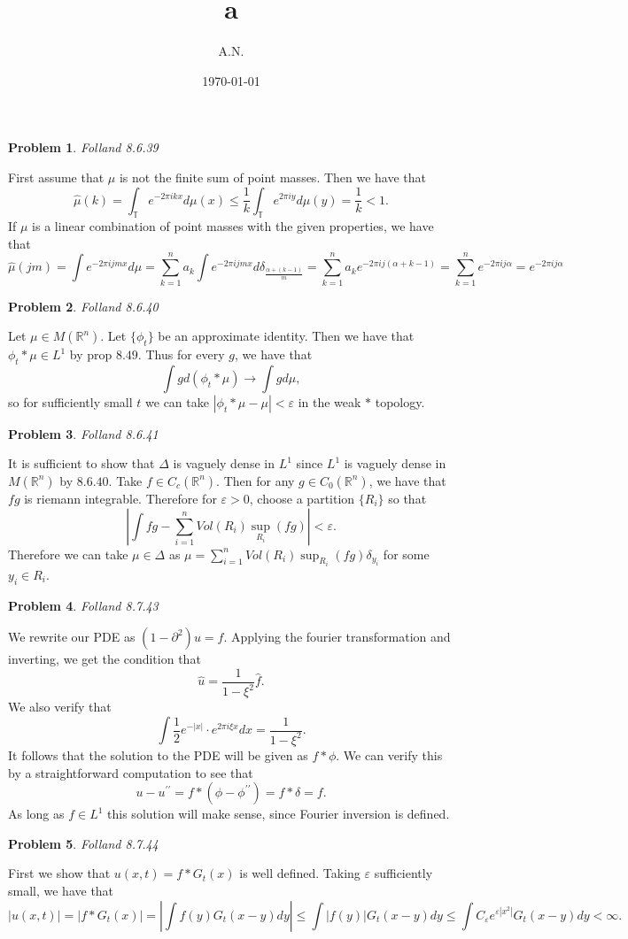 \documentclass[12pt, a4paper]{article}
\title{a}
\author{A.N.}
\date{\today}
\newtheorem{problem}{Problem}
\theoremstyle{definition}
\newcommand{\R}{\mathbb{R}}                           %
\newcommand{\ep}{\varepsilon}
\begin{document}
\begin{problem}
	Folland 8.6.39
\end{problem}
First assume that $\mu$ is not the finite sum of point masses. Then we have that 
$$\hat{\mu}(k) = \int_{\mathbb{T}} e^{-2\pi i kx} d\mu(x) \leq \frac{1}{k} \int_{\mathbb{T}}e^{2\pi i y}d\mu(y) = \frac{1}{k}<1. $$
If $\mu$ is a linear combination of point masses with the given properties, we have that 
$$\hat{\mu}(jm) =  \int e^{-2\pi i jm x } d\mu = \sum_{k=1}^n a_k \int e^{-2\pi i jmx} d \delta_{\frac{\alpha+(k-1)}{m}} = \sum_{k=1}^n a_k e^{-2\pi i j(\alpha + k-1)} =\sum_{k=1}^n e^{-2\pi i j \alpha} = e^{-2\pi i j \alpha} $$
\newpage 
\begin{problem}
	Folland 8.6.40
\end{problem}
Let $\mu\in M(\R^n)$. Let $\{\phi_t\}$ be an approximate identity. Then we have that $\phi_t \ast \mu\in L^1$ by prop $8.49$. Thus for every $g$, we have that $$\int g d(\phi_t \ast \mu) \to \int g d\mu,$$ so for sufficiently small $t$ we can take $|\phi_t \ast \mu - \mu|<\ep$ in the weak $*$ topology. 
\newpage 
\begin{problem}
	Folland 8.6.41
\end{problem}
It is sufficient to show that $\Delta$ is vaguely dense in $L^1$ since $L^1$ is vaguely dense in $M(\R^n)$ by $8.6.40$. Take $f\in C_c(\R^n)$. Then for any $g\in C_0(\R^n)$, we have that $fg$ is riemann integrable. Therefore for $\ep>0$, choose a partition $\{R_i\}$ so that 
$$\left| \int fg - \sum_{i=1}^n Vol(R_i)\sup_{R_i}(fg) \right|<\ep . $$ Therefore we can take $\mu\in \Delta$ as $\mu = \sum_{i=1}^n Vol(R_i)\sup_{R_i}(fg) \delta_{y_i}$ for some $y_i \in R_i$.
\newpage
\begin{problem}
	Folland 8.7.43
\end{problem}
We rewrite our PDE as $(1-\partial^2)u = f$. Applying the fourier transformation and inverting, we get the condition that $$\hat{u} = \frac{1}{1 - \xi^2}\hat{f}.$$ We also verify that $$\int \frac{1}{2}e^{-|x|}\cdot e^{2\pi i \xi x} dx =\frac{1}{1- \xi^2}. $$ It follows that the solution to the PDE will be given as $f\ast \phi$. We can verify this by a straightforward computation to see that $$u - u^{\prime \prime} = f\ast (\phi - \phi^{\prime \prime}) = f \ast \delta = f. $$ As long as $f\in L^1$ this solution will make sense, since Fourier inversion is defined.  
\newpage 
\begin{problem}
	Folland 8.7.44
\end{problem}
First we show that $u(x,t) = f\ast G_t(x)$ is well defined. Taking $\ep$ sufficiently small, we have that $$|u(x,t) | = |f\ast G_t(x)| = \left|\int f(y) G_t(x-y) dy\right| \leq \int |f(y)| G_t(x-y) dy \leq \int C_\ep e^{\ep |x^2|}G_t(x-y) dy <\infty.$$
\end{document}

